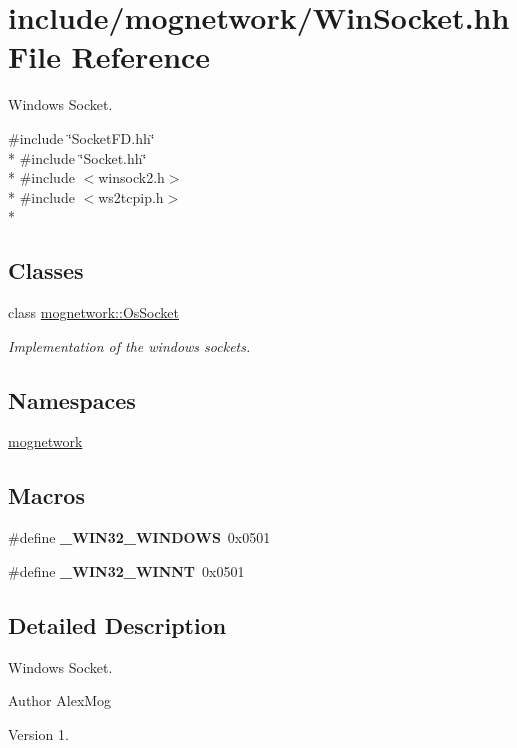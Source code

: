 \hypertarget{_win_socket_8hh}{\section{include/mognetwork/\-Win\-Socket.hh File Reference}
\label{_win_socket_8hh}
}


Windows Socket.  


{\ttfamily \#include \char`\"{}Socket\-F\-D.\-hh\char`\"{}}\\*
{\ttfamily \#include \char`\"{}Socket.\-hh\char`\"{}}\\*
{\ttfamily \#include $<$winsock2.\-h$>$}\\*
{\ttfamily \#include $<$ws2tcpip.\-h$>$}\\*
\subsection*{Classes}
\begin{DoxyCompactItemize}
\item 
class \hyperlink{classmognetwork_1_1_os_socket}{mognetwork\-::\-Os\-Socket}
\begin{DoxyCompactList}\small\item\em Implementation of the windows sockets. \end{DoxyCompactList}\end{DoxyCompactItemize}
\subsection*{Namespaces}
\begin{DoxyCompactItemize}
\item 
\hyperlink{namespacemognetwork}{mognetwork}
\end{DoxyCompactItemize}
\subsection*{Macros}
\begin{DoxyCompactItemize}
\item 
\hypertarget{_win_socket_8hh_a074ca98c073d899c62fc6629918186c8}{\#define {\bfseries \-\_\-\-W\-I\-N32\-\_\-\-W\-I\-N\-D\-O\-W\-S}~0x0501}\label{_win_socket_8hh_a074ca98c073d899c62fc6629918186c8}

\item 
\hypertarget{_win_socket_8hh_ac50762666aa00bd3a4308158510f1748}{\#define {\bfseries \-\_\-\-W\-I\-N32\-\_\-\-W\-I\-N\-N\-T}~0x0501}\label{_win_socket_8hh_ac50762666aa00bd3a4308158510f1748}

\end{DoxyCompactItemize}


\subsection{Detailed Description}
Windows Socket. \begin{DoxyAuthor}{Author}
Alex\-Mog 
\end{DoxyAuthor}
\begin{DoxyVersion}{Version}
1. 
\end{DoxyVersion}
